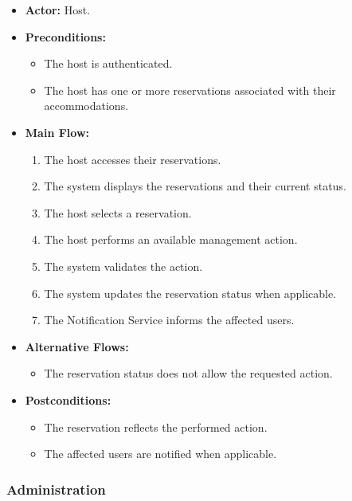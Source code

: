 \begin{itemize}
    \item \textbf{Actor:} Host.
    
    \item \textbf{Preconditions:}
    \begin{itemize}
        \item The host is authenticated.
        \item The host has one or more reservations associated with their accommodations.
    \end{itemize}
    
    \item \textbf{Main Flow:}
    \begin{enumerate}
        \item The host accesses their reservations.
        \item The system displays the reservations and their current status.
        \item The host selects a reservation.
        \item The host performs an available management action.
        \item The system validates the action.
        \item The system updates the reservation status when applicable.
        \item The Notification Service informs the affected users.
    \end{enumerate}
    
    \item \textbf{Alternative Flows:}
    \begin{itemize}
        \item The reservation status does not allow the requested action.
    \end{itemize}
    
    \item \textbf{Postconditions:}
    \begin{itemize}
        \item The reservation reflects the performed action.
        \item The affected users are notified when applicable.
    \end{itemize}
\end{itemize}


\subsubsection{Administration}

